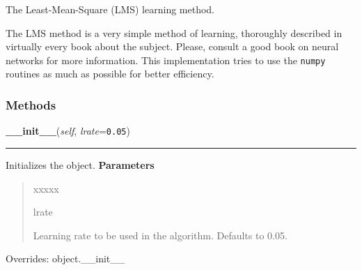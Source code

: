 The Least-Mean-Square (LMS) learning method.

The LMS method is a very simple method of learning, thoroughly described in
virtually every book about the subject. Please, consult a good book on
neural networks for more information. This implementation tries to use the
\texttt{numpy} routines as much as possible for better efficiency.


  \subsubsection{Methods}

    \vspace{0.5ex}

\hspace{.8\funcindent}\begin{boxedminipage}{\funcwidth}

    \raggedright \textbf{\_\_init\_\_}(\textit{self}, \textit{lrate}={\tt 0.05})

    \vspace{-1.5ex}

    \rule{\textwidth}{0.5\fboxrule}
\setlength{\parskip}{2ex}

Initializes the object.
\setlength{\parskip}{1ex}
      \textbf{Parameters}
      \vspace{-1ex}

      \begin{quote}
        \begin{Ventry}{xxxxx}

          \item[lrate]


Learning rate to be used in the algorithm. Defaults to 0.05.
        \end{Ventry}

      \end{quote}

      Overrides: object.\_\_init\_\_

    \end{boxedminipage}

    \vspace{0.5ex}

